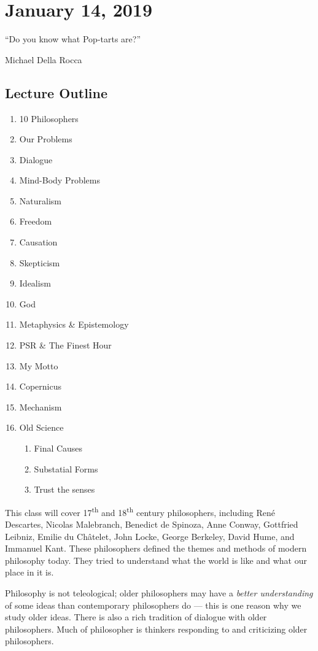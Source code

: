 
\section{January 14, 2019}

\epigraph{``Do you know what Pop-tarts are?''}{Michael Della Rocca}

\subsection*{Lecture Outline}
\begin{multicols}{2}
\begin{enumerate}
\item 10 Philosophers
\item Our Problems
\item Dialogue
\item Mind-Body Problems
\item Naturalism
\item Freedom
\item Causation
\item Skepticism
\item Idealism
\item God
\item Metaphysics \& Epistemology
\item PSR \& The Finest Hour
\item My Motto 
\item Copernicus
\item Mechanism
\item Old Science
\begin{enumerate}
\item Final Causes
\item Substatial Forms
\item Trust the senses
\end{enumerate}
\end{enumerate}
\end{multicols}

This class will cover 17\textsuperscript{th} and 18\textsuperscript{th} century philosophers, including René Descartes, Nicolas Malebranch, Benedict de Spinoza, Anne Conway, Gottfried Leibniz, Emilie du Châtelet, John Locke, George Berkeley, David Hume, and Immanuel Kant. These philosophers defined the themes and methods of modern philosophy today. They tried to understand what the world is like and what our place in it is.

Philosophy is not teleological; older philosophers may have a \emph{better understanding} of some ideas than contemporary philosophers do --- this is one reason why we study older ideas. There is also a rich tradition of dialogue with older philosophers. Much of philosopher is thinkers responding to and criticizing older philosophers.

